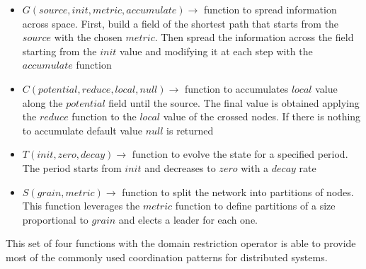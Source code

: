 \begin{itemize}
    \item $G(source, init, metric, accumulate) \rightarrow$ function to spread information across space. First, build a field of the shortest path that starts from the $source$ with the chosen $metric$. Then spread the information across the field starting from the $init$ value and modifying it at each step with the $accumulate$ function
    \item $C(potential, reduce, local, null) \rightarrow$ function to accumulates $local$ value along the $potential$ field until the source. The final value is obtained applying the $reduce$ function to the $local$ value of the crossed nodes. If there is nothing to accumulate default value $null$ is returned
    \item $T(init, zero, decay)  \rightarrow$ function to evolve the state for a specified period. The period starts from $init$ and decreases to $zero$ with a $decay$ rate
    \item $S(grain, metric)  \rightarrow$ function to split the network into partitions of nodes. This function leverages the $metric$ function to define partitions of a size proportional to $grain$ and elects a leader for each one.
\end{itemize}

This set of four functions with the domain restriction operator is able to provide most of the commonly used coordination patterns for distributed systems. 

